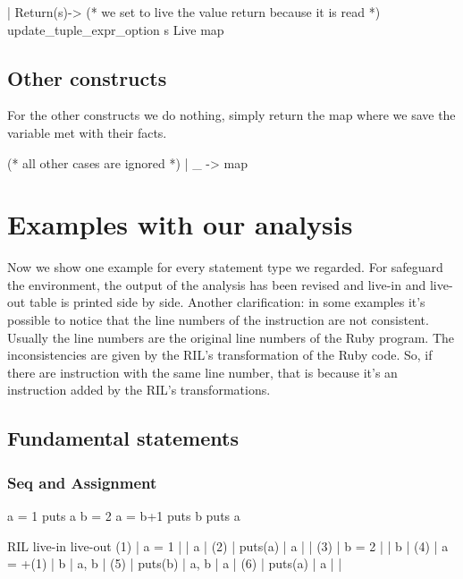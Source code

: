 \documentclass[a4paper]{article}   %
\begin{document}
\begin{ocaml}
| Return(s)-> 
    (* we set to live the value return because it is read *)
    update_tuple_expr_option s Live map
\end{ocaml}

\subsection{Other constructs}
For the other constructs we do nothing, simply return the map where we save the variable met with their facts.

\begin{ocaml}
(* all other cases are ignored *)
| _ -> 
    map 
\end{ocaml}


\section{Examples with our analysis}
Now we show one example for every statement type we regarded.
For safeguard the environment, the output of the analysis has been revised and live-in and live-out table is printed side by side.
Another clarification: in some examples it's possible to notice that the line numbers of the instruction are not consistent. Usually the line numbers are the original line numbers of the Ruby program. The inconsistencies are given by the RIL's transformation of the Ruby code. So, if there are instruction with the same line number, that is because it's an instruction added by the RIL's transformations.

\subsection{Fundamental statements}
\subsubsection*{Seq and Assignment}
\begin{ruby}
a = 1
puts a
b = 2
a = b+1
puts b
puts a
\end{ruby}
\begin{bash}
      RIL        live-in   live-out 
(1) | a = 1    |         | a        |
(2) | puts(a)  | a       |          |  
(3) | b = 2    |         | b        |
(4) | a = +(1) | b       | a, b     |
(5) | puts(b)  | a, b    | a        |
(6) | puts(a)  | a       |          |
\end{bash}

\end{document}
